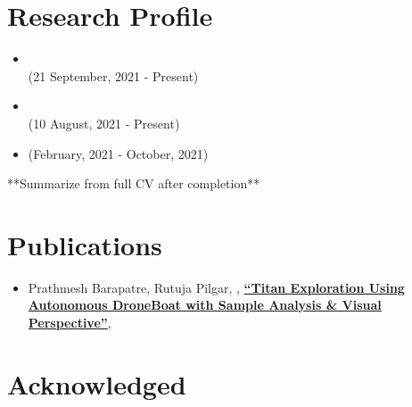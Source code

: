 \documentclass{My_CV}
\begin{document}
\begin{paracol}{2}
\begin{rightcolumn}
\section{{\faFlask} Research Profile}

\begin{itemize}

    \item {} \\
     \hfill{(21 September, 2021 - Present)}
    
    \item {} \\
     \hfill{(10 August, 2021 - Present)}
    
    \item {} \hfill{(February, 2021 - October, 2021)} \\
    
\end{itemize}

**Summarize from full CV after completion**



\section{{\faBook} Publications}

\begin{itemize}

    \item Prathmesh Barapatre, Rutuja Pilgar, , \href{https://dl.iafastro.directory/event/IAC-2021/paper/66117/}{\textbf{“Titan Exploration Using Autonomous DroneBoat with Sample Analysis \& Visual Perspective”}}, 
    
\end{itemize}



\section{{\faConnectdevelop} Acknowledged}


\end{rightcolumn}
\end{paracol}
\end{document}
